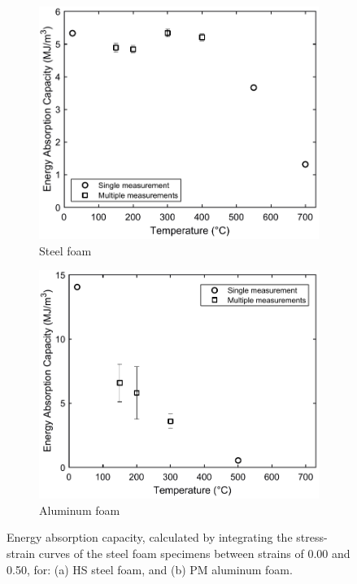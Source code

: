 \documentclass[review]{elsarticle}
\begin{document}
\begin{figure}
	\centering
	\begin{subfigure}{0.50\textwidth}
		\centering
		\includegraphics[width=0.90\linewidth]
		{Tex-Figures/Fig21a-EnergyCapacity-Fe.pdf}
		\caption{Steel foam}
		\label{fig:energyCapacity_Steel}
	\end{subfigure}%
	\begin{subfigure}{0.50\textwidth}
		\centering
		\includegraphics[width=0.90\linewidth]
		{Tex-Figures/Fig21b-EnergyCapacity-Al.pdf}
		\caption{Aluminum foam}
		\label{fig:energyCapacity_Al}
	\end{subfigure}
	\caption{Energy absorption capacity, calculated by integrating the stress-strain curves of the steel foam specimens between strains of 0.00 and 0.50, for: (a) HS steel foam, and (b) PM aluminum foam.}
	\label{fig:energyCapacity}
\end{figure}
\end{document}
